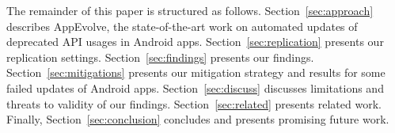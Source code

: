 The remainder of this paper is structured as follows. Section~\ref{sec:approach} describes AppEvolve, the state-of-the-art work on automated updates of deprecated API usages in Android apps. Section~\ref{sec:replication} presents our replication settings. Section~\ref{sec:findings} presents our findings. Section~\ref{sec:mitigations} presents our mitigation strategy and results for some failed updates of Android apps.
Section~\ref{sec:discuss} discusses limitations and threats to validity of our findings.
Section~\ref{sec:related} presents related work.
Finally, Section~\ref{sec:conclusion} concludes and presents promising future work.
